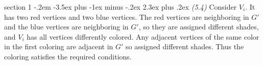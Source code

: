 \documentclass[12pt]{article}
\makeatletter
\theoremstyle{norm}
\newenvironment{problem}{\@startsection
       {section}
       {1}
       {-.2em}
       {-3.5ex plus -1ex minus -.2ex}
       {2.3ex plus .2ex}
       {\pagebreak[3]%
       \large\bf\noindent{Problem }
       }
       }
       {%
       }
\makeatother
\begin{document}
\begin{problem} {\it (5.4)}
Consider $V_i$. It has two red vertices and two blue vertices. The red vertices are neighboring in $G'$ and the blue vertices are neighboring in $G'$, so they are assigned different shades, and $V_i$ has all vertices differently colored. Any adjacent vertices of the same color in the first coloring are adjacent in $G'$ so assigned different shades. Thus the coloring satisfies the required conditions.
\end{problem}
\end{document}
